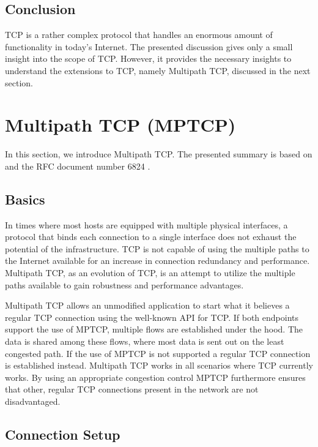 \subsection*{Conclusion}

TCP is a rather complex protocol that handles an enormous amount of functionality in today's Internet. The presented discussion gives only a small insight into the scope of TCP. However, it provides the necessary insights to understand the extensions to TCP, namely Multipath TCP, discussed in the next section.

\section{Multipath TCP (MPTCP)}
\label{sec:MPTCP}

In this section, we introduce Multipath TCP. The presented summary is based on \cite{Barre2011, Raiciu2012, Wischik2011} and the RFC document number 6824 \cite{rfc6824}.

\subsection*{Basics}

In times where most hosts are equipped with multiple physical interfaces, a protocol that binds each connection to a single interface does not exhaust the potential of the infrastructure. TCP is not capable of using the multiple paths to the Internet available for an increase in connection redundancy and performance. Multipath TCP, as an evolution of TCP, is an attempt to utilize the multiple paths available to gain robustness and performance advantages.

Multipath TCP allows an unmodified application to start what it believes a regular TCP connection using the well-known API for TCP. If both endpoints support the use of MPTCP, multiple flows are established under the hood. The data is shared among these flows, where most data is sent out on the least congested path. If the use of MPTCP is not supported a regular TCP connection is established instead. Multipath TCP works in all scenarios where TCP currently works. By using an appropriate congestion control MPTCP furthermore ensures that other, regular TCP connections present in the network are not disadvantaged. 

\subsection*{Connection Setup}

